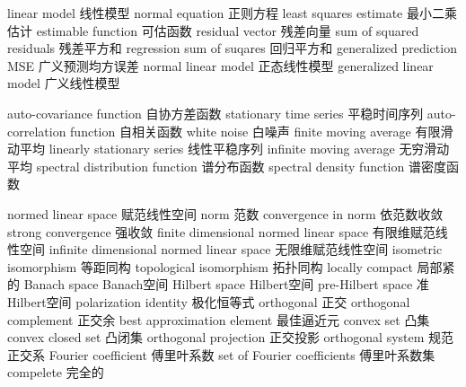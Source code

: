 {linear model} 
{线性模型}
{normal equation} 
{正则方程}
{least squares estimate} 
{最小二乘估计}
{estimable function} 
{可估函数}
{residual vector} 
{残差向量}
{sum of squared residuals} 
{残差平方和}
{regression sum of suqares} 
{回归平方和}
{generalized prediction MSE} 
{广义预测均方误差}
{normal linear model} 
{正态线性模型}
{generalized linear model} 
{广义线性模型}



{auto-covariance function} 
{自协方差函数}
{stationary time series} 
{平稳时间序列}
{auto-correlation function} 
{自相关函数}
{white noise} 
{白噪声}
{finite moving average} 
{有限滑动平均}
{linearly stationary series} 
{线性平稳序列}
{infinite moving average} 
{无穷滑动平均}
{spectral distribution function} 
{谱分布函数}
{spectral density function} 
{谱密度函数}


{normed linear space} 
{赋范线性空间}
{norm} 
{范数}
{convergence in norm} 
{依范数收敛}
{strong convergence} 
{强收敛}
{finite dimensional normed linear space} 
{有限维赋范线性空间}
{infinite dimensional normed linear space} 
{无限维赋范线性空间}
{isometric isomorphism} 
{等距同构}
{topological isomorphism} 
{拓扑同构}
{locally compact} 
{局部紧的}
{Banach space} 
{Banach空间}
{Hilbert space} 
{Hilbert空间}
{pre-Hilbert space} 
{准Hilbert空间}
{polarization identity} 
{极化恒等式}
{orthogonal} 
{正交}
{orthogonal complement} 
{正交余}
{best approximation element} 
{最佳逼近元}
{convex set} 
{凸集}
{convex closed set} 
{凸闭集}
{orthogonal projection} 
{正交投影}
{orthogonal system} 
{规范正交系}
{Fourier coefficient} 
{傅里叶系数}
{set of Fourier coefficients} 
{傅里叶系数集}
{compelete} 
{完全的}

